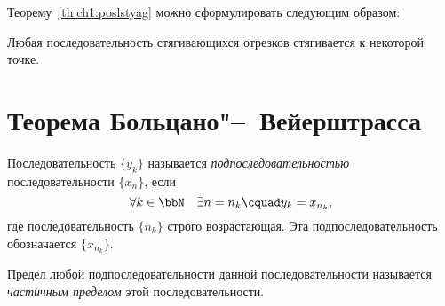 Теорему~\ref{th:ch1:poslstyag} можно сформулировать следующим образом: 
\begin{thmn}
Любая последовательность стягивающихся отрезков стягивается к некоторой точке.
\end{thmn}

\section{Теорема Больцано"--~Вейерштрасса}
\begin{defn}
Последовательность $\{y_k\}$ называется \textit{подпоследовательностью} последовательности $\{x_n\}$, если 
$$
\forall k \in \bbN \quad \exists n=n_k\cquad y_k=x_{n_k},
$$
где последовательность $\{n_k\}$ строго возрастающая. Эта подпоследовательность обозначается $\{x_{n_k}\}$.
\end{defn}

\begin{defn}
Предел любой подпоследовательности данной последовательности называется \textit{частичным пределом} этой последовательности.
\end{defn}

